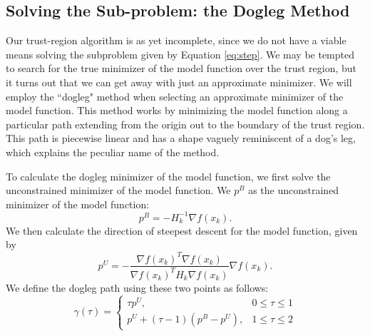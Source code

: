 \subsection*{Solving the Sub-problem: the Dogleg Method}
Our trust-region algorithm is as yet incomplete, since we do not have a viable means solving the subproblem
given by Equation \ref{eq:step}.
We may be tempted to search for the true minimizer of the model function over the trust region, but it turns out
that we can get away with just an approximate minimizer.
We will employ the ``dogleg" method when selecting an approximate minimizer of the model function.
This method works by minimizing the model function along a particular path extending from the origin out
to the boundary of the trust region.
This path is piecewise linear and has a shape vaguely reminiscent of a dog's leg, which explains the peculiar name of the method.

To calculate the dogleg minimizer of the model function, we first solve the unconstrained minimizer of the model function.  We $p^B$ as the unconstrained minimizer of the model function:
\[
p^B = -H_k^{-1}\nabla f(x_k).
\]
We then calculate the direction of steepest descent for the model function, given by
\[
p^U = -\frac{\nabla f(x_k)^T\nabla f(x_k)}{\nabla f(x_k)^TH_k\nabla f(x_k)}\nabla f(x_k).
\]
We define the dogleg path using these two points as follows:
\[
\gamma(\tau) =  \left\{
     \begin{array}{lr}
       \tau p^U, & 0\leq \tau \leq 1\\
       p^U+(\tau-1)(p^B-p^U), & 1\leq \tau\leq 2
     \end{array}
   \right.
\]

